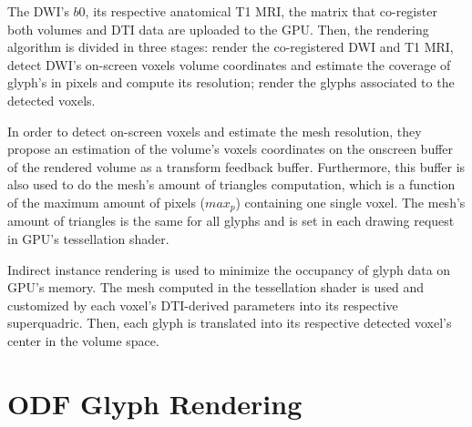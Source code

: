 \documentclass[twoside,twocolumn,10pt]{article}
\begin{document}



The DWI's $b0$, its respective anatomical T1 MRI, the matrix that co-register both volumes and DTI data are uploaded to the GPU. Then, the rendering algorithm is divided in three stages: render the co-registered DWI and T1 MRI, detect DWI's on-screen voxels volume coordinates and estimate the coverage of glyph's in pixels and compute its resolution; render the glyphs associated to the detected voxels. %

In order to detect on-screen voxels and estimate the mesh resolution, they propose an estimation of the volume's voxels coordinates on the onscreen buffer of the rendered volume as a transform feedback buffer. Furthermore, this buffer is also used to do the mesh's amount of triangles computation, which is a function of the maximum amount of pixels ($max_p$) containing one single voxel. The mesh's amount of triangles is the same for all glyphs and is set in each drawing request in GPU's tessellation shader.

Indirect instance rendering is used to minimize the occupancy of glyph data on GPU's memory. The mesh computed in the tessellation shader is used and customized by each voxel's DTI-derived parameters into its respective superquadric. Then, each glyph is translated into its respective detected voxel's center in the volume space.



 



\section{ODF Glyph Rendering}
\label{sec::odf_glyph_rendering}
\end{document}
